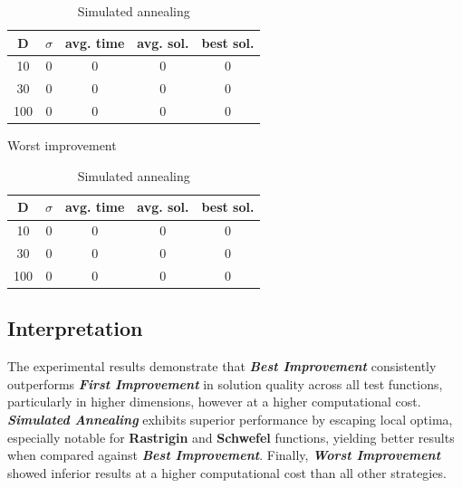 \documentclass{article}
\begin{document}
\begin{table}[!htbp]
\begin{minipage}{.4\linewidth}
    \centering

    \begin{tabular}{|c|c|c|c|c|}
    \hline
    D   & $\sigma$  & avg. time     & avg. sol.     & best sol. \\
    \hline
    10  & 0         & 0             & 0             & 0 \\
    \hline
    30  & 0         & 0             & 0             & 0 \\
    \hline
    100 & 0         & 0             & 0             & 0 \\
    \hline
    \end{tabular}
    \caption{Worst improvement}
  \end{minipage}%
  \quad %
  \begin{minipage}{.75\linewidth}
    \centering

    \begin{tabular}{|c|c|c|c|c|}
    \hline
    D   & $\sigma$  & avg. time     & avg. sol.     & best sol. \\
    \hline
    10  & 0         & 0             & 0             & 0 \\
    \hline
    30  & 0         & 0             & 0             & 0 \\
    \hline
    100 & 0         & 0             & 0             & 0 \\
    \hline
    \end{tabular}
    \caption{Simulated annealing}
  \end{minipage}
\end{table}


\subsection{Interpretation}

The experimental results demonstrate that \textit{\textbf{Best Improvement}} consistently outperforms \textit{\textbf{First Improvement}} in solution quality across all test functions, particularly in higher dimensions, however at a higher computational cost. \textit{\textbf{Simulated Annealing}} exhibits superior performance by escaping local optima, especially notable for \textbf{Rastrigin} and \textbf{Schwefel} functions, yielding better results when compared against \textit{\textbf{Best Improvement}}. Finally, \textit{\textbf{Worst Improvement}} showed inferior results at a higher computational cost than all other strategies.
\end{document}
